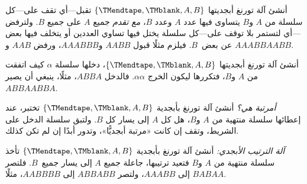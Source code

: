 \documentclass[../../../include/open-logic-section]{subfiles}
\begin{document}
\begin{prob}
أنشئ آلة تورنغ أبجديتها $\{\TMendtape,\TMblank,A,B\}$ تقبل---أي تقف على---كل سلسلة من $A$ و$B$ يتساوى فيها عدد $A$ وعدد $B$، \emph{مع تقدم} جميع $A$ على جميع $B$. ولترفض---أي لتستمر بلا توقف على---كل سلسلة يختل فيها تساوي العددين أو يتخلف فيها بعض $A$ عن بعض~$B$. فيلزم مثلًا قبول $AABB$ و$AAABBB$، ورفض $AAB$ و$AABBAABB$.
\end{prob}

\begin{prob}
أنشئ آلة تورنغ أبجديتها $\{\TMendtape,\TMblank,A,B\}$، دخلها سلسلة $\alpha$ كيف اتفقت من $A$ و$B$، فتكررها ليكون الخرج $\alpha\alpha$. فالدخل $ABBA$، مثلًا، ينبغي أن يصير $ABBAABBA$.
\end{prob}

\begin{prob}
\emph{أمرتبة هي؟} أنشئ آلة تورنغ بأبجدية $\{\TMendtape,\TMblank,A,B\}$ تختبر، عند إعطائها سلسلة منتهية من $A$ و$B$، هل كل $A$ إلى يسار كل $B$. ولتبق سلسلة الدخل على الشريط، وتقف إن كانت «مرتبة أبجديًّا»، وتدور أبدًا إن لم تكن كذلك.
\end{prob}

\begin{prob}
\emph{آلة الترتيب الأبجدي:} أنشئ آلة تورنغ بأبجدية $\{\TMendtape,\TMblank,A,B\}$ تأخذ سلسلة منتهية من $A$ و$B$ فتعيد ترتيبها، جاعلة جميع $A$ إلى يسار جميع~$B$. فلتصر $BABAA$ إلى $AAABB$، ولتصر $ABBABB$ إلى $AABBBB$، مثلًا.
\end{prob}
\end{document}
